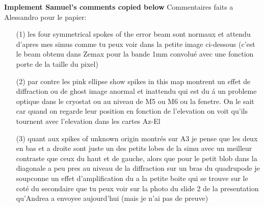 {\bf Implement Samuel's comments copied below}
Commentaires faits a Alessandro pour le papier:
\begin{itemize}
\item[(1)] les four symmetrical spokes of the error beam sont normaux
  et attendu d'apres mes simus comme tu peux voir dans la petite image
  ci-dessous (c'est le beam obtenu dans Zemax pour la bande 1mm
  convolu\'e avec une fonction porte de la taille du pixel)
\item[(2)] par contre les pink ellipse show spikes in this map
  montrent un effet de diffraction ou de ghost image anormal et
  inattendu qui est du \'a un probleme optique dans le cryostat ou au
  niveau de M5 ou M6 ou la fenetre. On le sait car quand on regarde
  leur position en fonction de l'elevation on voit qu'ils tournent
  avec l'elevation dans les cartes Az-El
\item[(3)] quant aux spikes of unknown origin montr\'es sur A3 je pense
  que les deux en bas et a droite sont juste un des petits lobes de la
  simu avec un meilleur contraste que ceux du haut et de gauche, alors
  que pour le petit blob dans la diagonale a peu pres au niveau de
  la diffraction sur un bras du quadrupode je soupconne un effet
  d'amplification du a la petite boite qui se trouve sur le cot\'e du
  secondaire que tu peux voir sur la photo du slide 2 de la
  presentation qu'Andrea a envoyee aujourd'hui (mais je n'ai pas de
  preuve)
\end{itemize}



